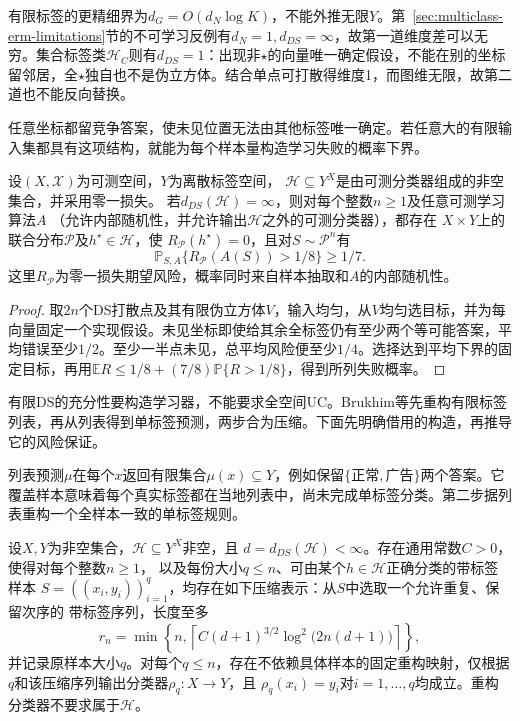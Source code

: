 有限标签的更精细界为$d_G=O(d_N\log K)$，不能外推无限$Y$。第~\ref{sec:multiclass-erm-limitations}节的不可学习反例有$d_N=1,d_{DS}=\infty$，故第一道维度差可以无穷。集合标签类$\mathcal H_C$则有$d_{DS}=1$：出现非$\star$的向量唯一确定假设，不能在别的坐标留邻居，全$\star$独自也不是伪立方体。结合单点可打散得维度1，而图维无限，故第二道也不能反向替换。

任意坐标都留竞争答案，使未见位置无法由其他标签唯一确定。若任意大的有限输入集都具有这项结构，就能为每个样本量构造学习失败的概率下界。

\begin{theorem}[无限DS维的不可学习性]
\label{thm:infinite-ds-lower-bound}
设$(X,\mathcal X)$为可测空间，$Y$为离散标签空间，
$\mathcal H\subseteq Y^X$是由可测分类器组成的非空集合，并采用零一损失。
若$d_{DS}(\mathcal H)=\infty$，则对每个整数$n\geq1$及任意可测学习算法$A$
（允许内部随机性，并允许输出$\mathcal H$之外的可测分类器），都存在
$X\times Y$上的联合分布$\mathcal P$及$h^\star\in\mathcal H$，使
$R_{\mathcal P}(h^\star)=0$，且对$S\sim\mathcal P^n$有
\[
 \mathbb P_{S,A}\{R_{\mathcal P}(A(S))>1/8\}\geq1/7.
\]
这里$R_{\mathcal P}$为零一损失期望风险，概率同时来自样本抽取和$A$的内部随机性。
\end{theorem}

\begin{proof}
取$2n$个DS打散点及其有限伪立方体$V$，输入均匀，从$V$均匀选目标，并为每向量固定一个实现假设。未见坐标即使给其余全标签仍有至少两个等可能答案，平均错误至少$1/2$。至少一半点未见，总平均风险便至少$1/4$。选择达到平均下界的固定目标，再用$\mathbb E R\leq1/8+(7/8)\mathbb P\{R>1/8\}$，得到所列失败概率。
\end{proof}

有限DS的充分性要构造学习器，不能要求全空间UC。Brukhim等先重构有限标签列表，再从列表得到单标签预测，两步合为压缩。下面先明确借用的构造，再推导它的风险保证。

列表预测$\mu$在每个$x$返回有限集合$\mu(x)\subseteq Y$，例如保留$\{\text{正常},\text{广告}\}$两个答案。它覆盖样本意味着每个真实标签都在当地列表中，尚未完成单标签分类。第二步据列表重构一个全样本一致的单标签规则。

\begin{lemma}[有限DS维的压缩构造]
\label{lem:finite-ds-compression}
设$X,Y$为非空集合，$\mathcal H\subseteq Y^X$非空，且
$d=d_{DS}(\mathcal H)<\infty$。存在通用常数$C>0$，使得对每个整数$n\geq1$，
以及每份大小$q\leq n$、可由某个$h\in\mathcal H$正确分类的带标签样本
$S=((x_i,y_i))_{i=1}^q$，均存在如下压缩表示：从$S$中选取一个允许重复、保留次序的
带标签序列，长度至多
\[
 r_n=\min\!\left\{n,\left\lceil
 C(d+1)^{3/2}\log^2\!\bigl(2n(d+1)\bigr)\right\rceil\right\},
\]
并记录原样本大小$q$。对每个$q\leq n$，存在不依赖具体样本的固定重构映射，仅根据
$q$和该压缩序列输出分类器$\rho_q:X\to Y$，且
$\rho_q(x_i)=y_i$对$i=1,\ldots,q$均成立。重构分类器不要求属于$\mathcal H$。
\end{lemma}

